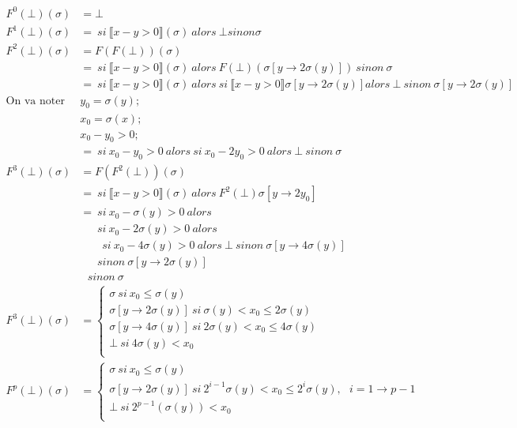 \documentclass[11pt,a4paper]{article}
\newcommand{\llbr}{\llbracket}
\newcommand{\rrbr}{\rrbracket}
\begin{document}
	\begin{align*}
	F^0(\bot)(\sigma) &= \bot\\
	F^1(\bot)(\sigma) &=\ si\ \llbr x - y > 0 \rrbr (\sigma)\ alors\ \bot sinon \sigma\\
	F^2(\bot)(\sigma) &= F(F(\bot))(\sigma)\\
	&=\ si\ \llbr x - y > 0 \rrbr(\sigma)\ alors\ F(\bot)(\sigma[y \to 2 \sigma(y)])\ sinon\ \sigma\\
	&=\ si\ \llbr x - y > 0 \rrbr(\sigma)\ alors\ si\ \llbr x - y > 0 \rrbr \sigma [y \to 2 \sigma(y)] alors\ \bot\ sinon\ \sigma [y \to 2 \sigma (y)]\\
	\text{On va noter } &y_0 = \sigma(y);\\
	&x_0 = \sigma(x);\\
	&x_0 - y_0 > 0;\\
	&=\ si\ x_0 - y_0 > 0\ alors\ si\ x_0 - 2y_0 > 0\ alors\ \bot\ sinon\ \sigma\\
	F^3(\bot)(\sigma) &= F(F^2(\bot))(\sigma)\\
	&=\ si\ \llbr x - y > 0 \rrbr (\sigma)\ alors\ F^2(\bot) \sigma [y \to 2 y_0]\\
	&=\ si\ x_0 - \sigma(y) > 0\ alors\\
	&\ \ \ \ \ \ \ si\ x_0 - 2 \sigma(y) > 0\ alors\\
	&\ \ \ \ \ \ \ \ \ si\ x_0 - 4 \sigma(y) > 0\ alors\ \bot\ sinon\ \sigma[y \to 4 \sigma(y)]\\
	&\ \ \ \ \ \ \ sinon\ \sigma [y \to 2 \sigma(y)]\\
	&\ \ \ sinon\ \sigma\\
	F^3(\bot)(\sigma) &= \begin{cases}
							\sigma\ si\ x_0 \leqslant \sigma(y)\\
							\sigma [y \to 2 \sigma(y)]\ si\ \sigma(y) < x_0 \leqslant 2 \sigma(y)\\
							\sigma [y \to 4 \sigma(y)]\ si\ 2 \sigma(y) < x_0 \leqslant 4 \sigma (y)\\
							\bot\ si\ 4 \sigma(y) < x_0\\
						 \end{cases}\\
	F^p(\bot)(\sigma) &= \begin{cases}
							\sigma\ si\ x_0 \leqslant \sigma(y)\\
							\sigma[y \to 2 \sigma(y)]\ si\ 2^{i-1}\sigma(y) < x_0 \leqslant 2^i \sigma(y), \ \ \ i = 1 \to p-1\\
							\bot\ si\ 2^{p-1}(\sigma(y)) < x_0\\

\end{cases}
\end{align*}
\end{document}

